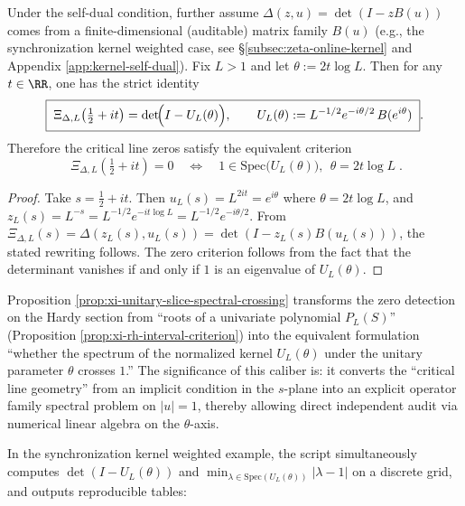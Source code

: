 \begin{proposition}\label{prop:xi-unitary-slice-spectral-crossing}
Under the self-dual condition, further assume
\(
\Delta(z,u)=\det(I-zB(u))
\)
comes from a finite-dimensional (auditable) matrix family \(B(u)\) (e.g., the synchronization kernel weighted case, see \S\ref{subsec:zeta-online-kernel} and Appendix \ref{app:kernel-self-dual}).
Fix \(L>1\) and let \(\theta:=2t\log L\).
Then for any \(t\in\RR\), one has the strict identity
\[
\boxed{\;
\Xi_{\Delta,L}\!\left(\tfrac12+it\right)
=
\det\!\Bigl(I-U_L(\theta)\Bigr),\qquad
U_L(\theta):=L^{-1/2}e^{-i\theta/2}\,B(e^{i\theta})\; }.
\]
Therefore the critical line zeros satisfy the equivalent criterion
\[
\boxed{\;
\Xi_{\Delta,L}\!\left(\tfrac12+it\right)=0
\quad\Longleftrightarrow\quad
1\in\mathrm{Spec}\bigl(U_L(\theta)\bigr),\ \ \theta=2t\log L\; }.
\]
\end{proposition}
\begin{proof}
Take \(s=\tfrac12+it\). Then
\(
u_L(s)=L^{2it}=e^{i\theta}
\)
where \(\theta=2t\log L\), and
\(
z_L(s)=L^{-s}=L^{-1/2}e^{-it\log L}=L^{-1/2}e^{-i\theta/2}
\).
From \(\Xi_{\Delta,L}(s)=\Delta(z_L(s),u_L(s))=\det(I-z_L(s)B(u_L(s)))\), the stated rewriting follows.
The zero criterion follows from the fact that the determinant vanishes if and only if \(1\) is an eigenvalue of \(U_L(\theta)\). \qedhere
\end{proof}

\begin{remark}\label{rem:xi-unitary-slice-operator-audit}
Proposition \ref{prop:xi-unitary-slice-spectral-crossing} transforms the zero detection on the Hardy section from
``roots of a univariate polynomial \(P_L(S)\)'' (Proposition \ref{prop:xi-rh-interval-criterion})
into the equivalent formulation
``whether the spectrum of the normalized kernel \(U_L(\theta)\) under the unitary parameter \(\theta\) crosses \(1\).''
The significance of this caliber is: it converts the ``critical line geometry'' from an implicit condition in the \(s\)-plane into an explicit operator family spectral problem on \(|u|=1\), thereby allowing direct independent audit via numerical linear algebra on the \(\theta\)-axis.
\par
In the synchronization kernel weighted example, the script  simultaneously computes
\(\det(I-U_L(\theta))\) and \(\min_{\lambda\in\mathrm{Spec}(U_L(\theta))}|\lambda-1|\) on a discrete grid, and outputs reproducible tables:

\end{remark}

